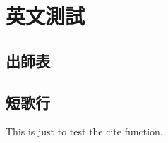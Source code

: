 
\chapter{英文測試}

\begin{tempsection}

\section{出師表}

\lipsum

\section{短歌行}

\lipsum

This is just to test \cite{Krasnogor2004e} the cite function.

\end{tempsection}